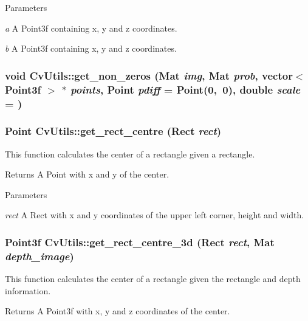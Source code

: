\begin{DoxyParams}{Parameters}
\item[{\em a}]A Point3f containing x, y and z coordinates. \item[{\em b}]A Point3f containing x, y and z coordinates. \end{DoxyParams}
\hypertarget{classCvUtils_a426439fc003e5557644932eee66c48b6}{
\subsubsection[{get\_\-non\_\-zeros}]{\setlength{\rightskip}{0pt plus 5cm}void CvUtils::get\_\-non\_\-zeros (Mat {\em img}, \/  Mat {\em prob}, \/  vector$<$ Point3f $>$ $\ast$ {\em points}, \/  Point {\em pdiff} = {\ttfamily Point(0,~0)}, \/  double {\em scale} = {})}}
\label{classCvUtils_a426439fc003e5557644932eee66c48b6}
\hypertarget{classCvUtils_aa54494728db8503a7311ff2f9ad8ab1c}{
\subsubsection[{get\_\-rect\_\-centre}]{\setlength{\rightskip}{0pt plus 5cm}Point CvUtils::get\_\-rect\_\-centre (Rect {\em rect})}}
\label{classCvUtils_aa54494728db8503a7311ff2f9ad8ab1c}
This function calculates the center of a rectangle given a rectangle. \begin{DoxyReturn}{Returns}
A Point with x and y of the center. 
\end{DoxyReturn}

\begin{DoxyParams}{Parameters}
\item[{\em rect}]A Rect with x and y coordinates of the upper left corner, height and width. \end{DoxyParams}
\hypertarget{classCvUtils_a9a91a1dbd7a74ef15257510129308277}{
\subsubsection[{get\_\-rect\_\-centre\_\-3d}]{\setlength{\rightskip}{0pt plus 5cm}Point3f CvUtils::get\_\-rect\_\-centre\_\-3d (Rect {\em rect}, \/  Mat {\em depth\_\-image})}}
\label{classCvUtils_a9a91a1dbd7a74ef15257510129308277}
This function calculates the center of a rectangle given the rectangle and depth information. \begin{DoxyReturn}{Returns}
A Point3f with x, y and z coordinates of the center. 
\end{DoxyReturn}

